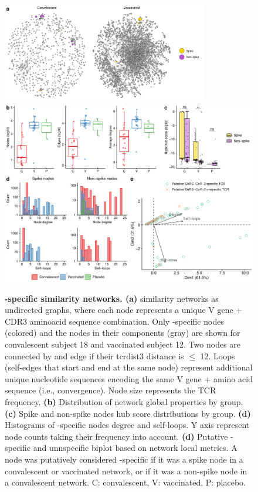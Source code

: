 \begin{figure}[!t]
	\centering
	\includegraphics[width=0.8\textwidth,keepaspectratio]{figures/two_nets.png}
	\includegraphics[width=\textwidth,keepaspectratio]{figures/fig4.pdf}
	\caption{\textbf{\covid-specific \TCRB{} similarity networks. (a)} \TCRB{} similarity networks as undirected graphs, where each node represents a unique V gene + CDR3 aminoacid sequence combination. Only \covid-specific nodes (colored) and the nodes in their components (gray) are shown for convalescent subject 18 and vaccinated subject 12. Two nodes are connected by and edge if their tcrdist3 distance is $\leq$ 12. Loops (self-edges that start and end at the same node) represent additional unique nucleotide sequences encoding the same V gene + amino acid sequence (i.e., convergence). Node size represents the TCR frequency. \textbf{(b)} Distribution of network global properties by group. \textbf{(c)} Spike and non-spike nodes hub score distributions by group. \textbf{(d)} Histograms of \covid-specific nodes degree and self-loops. Y axis represent node counts taking their frequency into account. \textbf{(d)} Putative \covid-specific and unnspecific biplot based on network local metrics. A node was putatively considered \covid-specific if it was a spike node in a convalescent or vaccinated network, or if it was a non-spike node in a convalescent network.  C: convalescent, V: vaccinated, P: placebo.}
	\label{fig:nets}
\end{figure}


